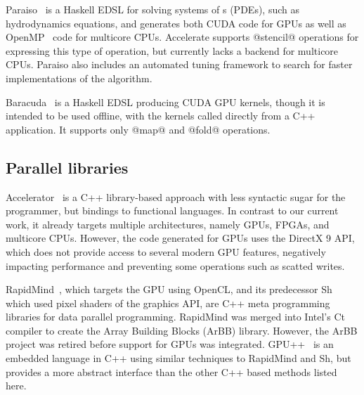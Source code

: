 
Paraiso~\cite{Muranushi:2012eh} is a Haskell EDSL for solving systems of
s (PDEs), such as hydrodynamics equations,
and generates both CUDA code for GPUs as well as OpenMP~\cite{OpenMP:2008} code
for multicore CPUs. Accelerate supports @stencil@ operations for expressing this
type of operation, but currently lacks a backend for multicore CPUs. Paraiso
also includes an automated tuning framework to search for faster implementations
of the algorithm.

Baracuda~\cite{Larsen:2011fa} is a Haskell EDSL producing CUDA GPU kernels,
though it is intended to be used offline, with the kernels called directly from
a C++ application. It supports only @map@ and @fold@ operations.


\subsection{Parallel libraries}


Accelerator~\cite{Bond:2010bd,Tarditi:2006} is a C++ library-based approach with
less syntactic sugar for the programmer, but bindings to functional languages.
In contrast to our current work, it already targets multiple architectures,
namely GPUs, FPGAs, and multicore CPUs. However, the code generated for GPUs
uses the DirectX 9 API, which does not provide access to several modern GPU
features, negatively impacting performance and preventing some operations such
as scatted writes.

RapidMind~\cite{LinXu:2008ig}, which targets the GPU using OpenCL, and its
predecessor Sh~\cite{McCool:2004,McCool:2004un} which used pixel shaders of the
graphics API, are C++ meta programming libraries for data parallel programming.
RapidMind was merged into Intel's Ct compiler to create the Array Building
Blocks (ArBB) library. However, the ArBB project was retired before support for
GPUs was integrated. GPU++~\cite{Jansen:2008vw} is an embedded language in C++
using similar techniques to RapidMind and Sh, but provides a more abstract
interface than the other C++ based methods listed here.

